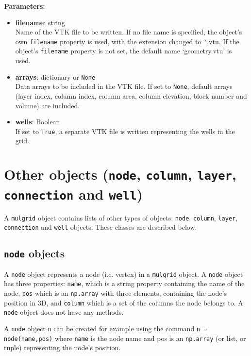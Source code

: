 \textbf{Parameters:}
\begin{itemize}
\item \textbf{filename}: string\\
  Name of the VTK file to be written.  If no file name is specified, the object's own \texttt{filename} property is used, with the extension changed to *.vtu.  If the object's \texttt{filename} property is not set, the default name `geometry.vtu' is used.
\item \textbf{arrays}: dictionary or \texttt{None}\\
  Data arrays to be included in the VTK file.  If set to \texttt{None}, default arrays (layer index, column index, column area, column elevation, block number and volume) are included.
\item \textbf{wells}: Boolean\\
  If set to \texttt{True}, a separate VTK file is written representing the wells in the grid.
\end{itemize}

\section{Other objects (\texttt{node}, \texttt{column}, \texttt{layer}, \texttt{connection} and \texttt{well})}
\label{other_mulgrid_objects}

A \texttt{mulgrid} object contains lists of other types of objects: \texttt{node}, \texttt{column}, \texttt{layer}, \texttt{connection} and \texttt{well} objects.  These classes are described below.

\subsection{\texttt{node} objects}

A \texttt{node} object represents a node (i.e. vertex) in a \texttt{mulgrid} object.  A \texttt{node} object has three properties: \texttt{name}, which is a string property containing the name of the node, \texttt{pos} which is an \texttt{np.array} with three elements, containing the node's position in 3D, and \texttt{column} which is a set of the columns the node belongs to.  A \texttt{node} object does not have any methods.

A \texttt{node} object \texttt{n} can be created for example using the command \texttt{n = node(name,pos)} where \texttt{name} is the node name and pos is an \texttt{np.array} (or list, or tuple) representing the node's position.

